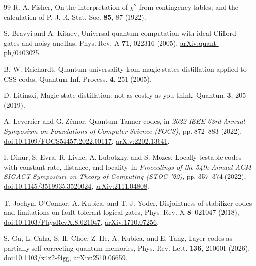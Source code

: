 \begin{thebibliography}{99}
R. A. Fisher, On the interpretation of $\chi^2$ from contingency tables, and the calculation of P, J. R. Stat. Soc. \textbf{85}, 87 (1922).

S. Bravyi and A. Kitaev, Universal quantum computation with ideal Clifford gates and noisy ancillas, Phys. Rev. A \textbf{71}, 022316 (2005), \href{https://arxiv.org/abs/quant-ph/0403025}{arXiv:quant-ph/0403025}.

B. W. Reichardt, Quantum universality from magic states distillation applied to CSS codes, Quantum Inf. Process. \textbf{4}, 251 (2005).

D. Litinski, Magic state distillation: not as costly as you think, Quantum \textbf{3}, 205 (2019).

A. Leverrier and G. Z\'emor, Quantum Tanner codes, in \emph{2022 IEEE 63rd Annual Symposium on Foundations of Computer Science (FOCS)}, pp. 872--883 (2022), \href{https://doi.org/10.1109/FOCS54457.2022.00117}{doi:10.1109/FOCS54457.2022.00117}, \href{https://arxiv.org/abs/2202.13641}{arXiv:2202.13641}.

I. Dinur, S. Evra, R. Livne, A. Lubotzky, and S. Mozes, Locally testable codes with constant rate, distance, and locality, in \emph{Proceedings of the 54th Annual ACM SIGACT Symposium on Theory of Computing (STOC '22)}, pp. 357--374 (2022), \href{https://doi.org/10.1145/3519935.3520024}{doi:10.1145/3519935.3520024}, \href{https://arxiv.org/abs/2111.04808}{arXiv:2111.04808}.

T. Jochym-O'Connor, A. Kubica, and T. J. Yoder, Disjointness of stabilizer codes and limitations on fault-tolerant logical gates, Phys. Rev. X \textbf{8}, 021047 (2018), \href{https://doi.org/10.1103/PhysRevX.8.021047}{doi:10.1103/PhysRevX.8.021047}, \href{https://arxiv.org/abs/1710.07256}{arXiv:1710.07256}.

S. Gu, L. Caha, S. H. Choe, Z. He, A. Kubica, and E. Tang, Layer codes as partially self-correcting quantum memories, Phys. Rev. Lett. \textbf{136}, 210601 (2026), \href{https://doi.org/10.1103/x4z2-f4gg}{doi:10.1103/x4z2-f4gg}, \href{https://arxiv.org/abs/2510.06659}{arXiv:2510.06659}.

\end{thebibliography}
